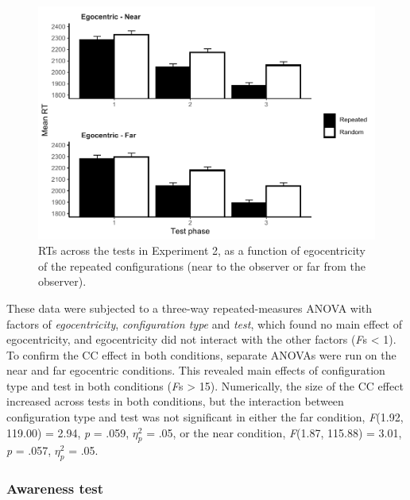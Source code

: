 \documentclass[
  man,floatsintext]{apa7}
\begin{document}
\begin{figure}

{\centering \includegraphics[width=1\linewidth]{CCVR_manuscript_files/figure-latex/Exp2-ego-figure-1} 

}

\caption{RTs across the tests in Experiment 2, as a function of egocentricity of the repeated configurations (near to the observer or far from the observer).}\label{fig:Exp2-ego-figure}
\end{figure}

These data were subjected to a three-way repeated-measures ANOVA with factors of \emph{egocentricity}, \emph{configuration type} and \emph{test}, which found no main effect of egocentricity, and egocentricity did not interact with the other factors (\emph{F}s \textless{} 1). To confirm the CC effect in both conditions, separate ANOVAs were run on the near and far egocentric conditions. This revealed main effects of configuration type and test in both conditions (\emph{F}s \textgreater{} 15). Numerically, the size of the CC effect increased across tests in both conditions, but the interaction between configuration type and test was not significant in either the far condition, \emph{F}(1.92, 119.00) = 2.94, \emph{p} = .059, \(\eta^2_p\) = .05, or the near condition, \emph{F}(1.87, 115.88) = 3.01, \emph{p} = .057, \(\eta^2_p\) = .05.

\hypertarget{awareness-test}{%
\subsubsection{Awareness test}\label{awareness-test}}
\end{document}
